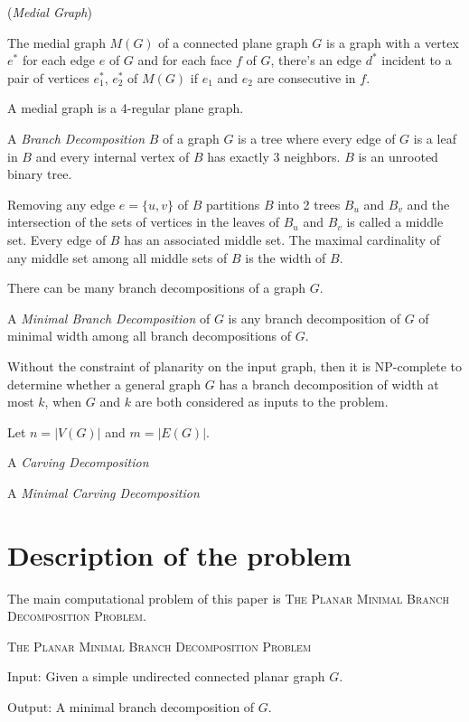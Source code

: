 \documentclass{article}
\begin{document}
	\begin{definition}
		(\textit{Medial Graph})

		The medial graph $M(G)$ of a connected plane graph $G$ is a graph with a vertex $e^*$ for each edge $e$ of $G$ and for each face $f$ of $G$, there's an edge $d^*$ incident to a pair of vertices $e_1^*$, $e_2^*$ of $M(G)$ if $e_1$ and $e_2$ are consecutive in $f$.
	\end{definition}

	\begin{corollary}
		A medial graph is a 4-regular plane graph.
	\end{corollary}

	A \textit{Branch Decomposition} $B$ of a graph $G$ is a tree where every edge of $G$ is a leaf in $B$ and every internal vertex of $B$ has exactly 3 neighbors. $B$ is an unrooted binary tree.

	Removing any edge $e = \{u,v\}$ of $B$ partitions $B$ into 2 trees $B_u$ and $B_v$ and the intersection of the sets of vertices in the leaves of $B_u$ and $B_v$ is called a middle set. Every edge of $B$ has an associated middle set. The maximal cardinality of any middle set among all middle sets of $B$ is the width of $B$.

	There can be many branch decompositions of a graph $G$.

	A \textit{Minimal Branch Decomposition} of $G$ is any branch decomposition of $G$ of minimal width among all branch decompositions of $G$.

	Without the constraint of planarity on the input graph, then it is NP-complete to determine whether a general graph $G$ has a branch decomposition of width at most $k$, when $G$ and $k$ are both considered as inputs to the problem.

	Let $n = |V(G)|$ and $m = |E(G)|$.

	A \textit{Carving Decomposition}

	A \textit{Minimal Carving Decomposition}

\section{Description of the problem}

	The main computational problem of this paper is \textsc{The Planar Minimal Branch Decomposition Problem}.

	\begin{definition}
		\textsc{The Planar Minimal Branch Decomposition Problem}

		Input: Given a simple undirected connected planar graph $G$.

		Output: A minimal branch decomposition of $G$.
	\end{definition}
\end{document}
